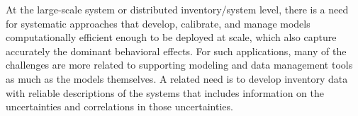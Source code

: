 At the large-scale system or distributed inventory/system level, there is a need for systematic approaches that develop, calibrate, and manage models computationally efficient enough to be deployed at scale, which also capture accurately the dominant behavioral effects. For such applications, many of the challenges are more related to supporting modeling and data management tools as much as the models themselves. A related need is to develop inventory data with reliable descriptions of the systems that includes information on the uncertainties and correlations in those uncertainties. 
